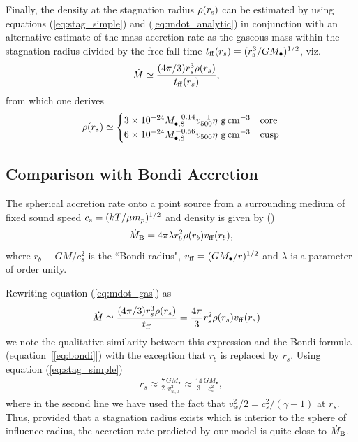\documentclass[usenatbib,fleqn]{mn2e}
\newcommand{\rs}{r_s}
\newcommand{\rb}{r_b}
\newcommand{\Mbh}[1][]{M_{\bullet#1}}
\newcommand{\Mbheight}{M_{\bullet,8}}
\newcommand{\ff}{\rm ff}
\newcommand{\vwO}{v_{w,0}}
\begin{document}
Finally, the density at the stagnation radius $\rho(r_{\rm s})$ can be estimated by using equations (\ref{eq:stag_simple}) and (\ref{eq:mdot_analytic}) in conjunction with an alternative estimate of the mass accretion rate as the gaseous mass within the stagnation radius divided by the free-fall time $t_{\rm ff}(\rs) = (r_{\rm s}^{3}/GM_{\bullet})^{1/2}$, viz.
\begin{align}
  &\dot{M}\simeq\frac{(4 \pi/3) \rs^3 \rho(\rs)}{t_{\ff}(\rs)},
  \label{eq:mdot_gas}
\end{align}
from which one derives 
\begin{align}
  \rho(\rs)\simeq
  \begin{cases}
    3 \times 10^{-24} \Mbheight^{-0.14} v_{500}^{-1}  \eta \,
    \, {\rm g \, cm^{-3}}& \text{core}\\
    6 \times 10^{-24}  \Mbheight^{-0.56} v_{500}    \eta \,\, {\rm g \,cm^{-3}} & \text{cusp}
  \end{cases}
  \label{eq:rhors}
\end{align}


\subsection{Comparison with Bondi Accretion}
The spherical accretion rate onto a point source from a surrounding medium of fixed sound speed $c_{\rm s} = (kT/\mu m_p)^{1/2}$ and density is given by (\citealt{Bondi52}) 
\begin{align}
  \dot{M}_{\rm B} =4\pi \lambda r_b^2 \rho(r_b) v_{\rm ff}(r_b),
\label{eq:bondi}
\end{align}
where $r_b \equiv GM/c_{s}^{2}$ is the ``Bondi radius", $v_{\rm ff} = (GM_{\bullet}/r)^{1/2}$ and $\lambda$ is a parameter of order unity.  

Rewriting equation (\ref{eq:mdot_gas}) as
\begin{align}
  &\dot{M}\simeq\frac{(4 \pi/3) \rs^3 \rho(\rs)}{t_{\ff}} =\frac{4 \pi}{3} \rs^2 \rho(\rs) v_{\ff}(\rs)
\end{align}
we note the qualitative similarity between this expression and the Bondi formula (equation~[\ref{eq:bondi}]) with the exception that $\rb$ is replaced by $\rs$.  Using equation (\ref{eq:stag_simple})
\begin{align}
  \rs\approx\frac{7}{2}\frac{G \Mbh}{\vwO^2} \approx \frac{14}{3}\frac{GM_{\bullet}}{c_{s}^{2}},
  \label{eq:rs_simple}
\end{align}
where in the second line we have used the fact that $v_{w}^{2}/2 =
c_s^2/(\gamma-1)$ at $\rs$.  Thus, provided that a stagnation radius
exists which is interior to the sphere of influence radius, the
accretion rate predicted by our model is quite close to $\dot{M}_{\rm
  B}$.
\end{document}

